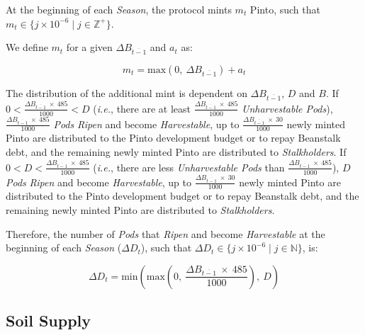 \documentclass[tikz]{article}
\newcommand{\term}[1]{\textsl{#1}}
\begin{document}
At the beginning of each \term{Season}, the protocol mints $m_{t}$ Pinto, such that $m_{t} \in \{j \times 10^{-6} \mid j \in \mathbb{Z}^{+} \}$.

We define $m_{t}$ for a given $\Delta B_{\overline{t-1}}$ and $a_{t}$ as:

    $$
        m_{t} = 
            \text{max}(0,\ \Delta B_{\overline{t-1}}) + a_{t}
    $$

The distribution of the additional mint is dependent on $\Delta B_{\overline{t-1}}$, $D$ and $B$. If $0 < \frac{\Delta B_{\overline{t-1}}\ \times\ 485}{1000} < D$ (\textit{i.e.}, there are at least $\frac{\Delta B_{\overline{t-1}}\ \times\ 485}{1000}$ \term{Unharvestable Pods}), $\frac{\Delta B_{\overline{t-1}}\ \times\ 485}{1000}$ \term{Pods} \term{Ripen} and become \term{Harvestable}, up to $\frac{\Delta B_{\overline{t-1}}\ \times\ 30}{1000}$ newly minted Pinto are distributed to the Pinto development budget or to repay Beanstalk debt, and the remaining newly minted Pinto are distributed to \term{Stalkholders}. If $0 < D < \frac{\Delta B_{\overline{t-1}}\ \times\ 485}{1000}$ (\textit{i.e.}, there are less \term{Unharvestable Pods} than $\frac{\Delta B_{\overline{t-1}}\ \times\ 485}{1000}$), $D$ \term{Pods} \term{Ripen} and become \term{Harvestable}, up to $\frac{\Delta B_{\overline{t-1}}\ \times\ 30}{1000}$ newly minted Pinto are distributed to the Pinto development budget or to repay Beanstalk debt, and the remaining newly minted Pinto are distributed to \term{Stalkholders}.

\newpage

Therefore, the number of \term{Pods} that \term{Ripen} and become \term{Harvestable} at the beginning of each \term{Season} ($\Delta D_{t}$), such that $\Delta D_{t} \in \{j \times 10^{-6} \mid j \in \mathbb{N} \}$, is:

    $$
        \Delta D_{t} = 
            \text{min}\left(
                \text{max}\left
                    (0,\ 
                    \frac{\Delta B_{\overline{t-1}}\ \times\ 485}
                            {1000}\right),\ 
                D\right)
    $$


\subsection{Soil Supply}
\end{document}
